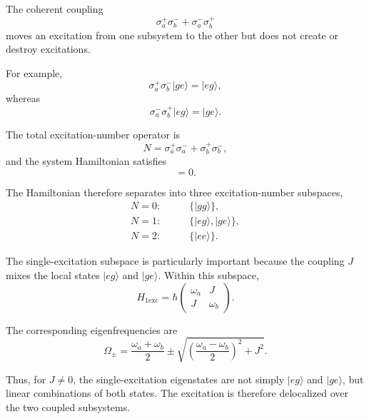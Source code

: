 \documentclass[11pt]{article}
\begin{document}
The coherent coupling
%
\begin{equation}
\sigma_a^+\sigma_b^-
+
\sigma_a^-\sigma_b^+
\end{equation}
%
moves an excitation from one subsystem to the other but does not create
or destroy excitations.

For example,
%
\begin{equation}
\sigma_a^+\sigma_b^-|ge\rangle
=
|eg\rangle,
\end{equation}
%
whereas
%
\begin{equation}
\sigma_a^-\sigma_b^+|eg\rangle
=
|ge\rangle.
\end{equation}

The total excitation-number operator is
%
\begin{equation}
N
=
\sigma_a^+\sigma_a^-
+
\sigma_b^+\sigma_b^-,
\end{equation}
%
and the system Hamiltonian satisfies
%
\begin{equation}
[H_S,N]=0.
\end{equation}

The Hamiltonian therefore separates into three excitation-number
subspaces,
%
\begin{align}
N=0:&
\qquad
\{|gg\rangle\},
\\
N=1:&
\qquad
\{|eg\rangle,|ge\rangle\},
\\
N=2:&
\qquad
\{|ee\rangle\}.
\end{align}

The single-excitation subspace is particularly important because the
coupling $J$ mixes the local states $|eg\rangle$ and $|ge\rangle$.
Within this subspace,
%
\begin{equation}
\boxed{
H_{\mathrm{1exc}}
=
\hbar
\begin{pmatrix}
\omega_a & J
\\
J & \omega_b
\end{pmatrix}.
}
\label{eq:single_excitation_hamiltonian}
\end{equation}

The corresponding eigenfrequencies are
%
\begin{equation}
\boxed{
\Omega_\pm
=
\frac{\omega_a+\omega_b}{2}
\pm
\sqrt{
\left(
\frac{\omega_a-\omega_b}{2}
\right)^2
+
J^2
}.
}
\label{eq:dimer_eigenfrequencies}
\end{equation}

Thus, for $J\neq0$, the single-excitation eigenstates are not simply
$|eg\rangle$ and $|ge\rangle$, but linear combinations of both states.
The excitation is therefore delocalized over the two coupled
subsystems.
\end{document}
